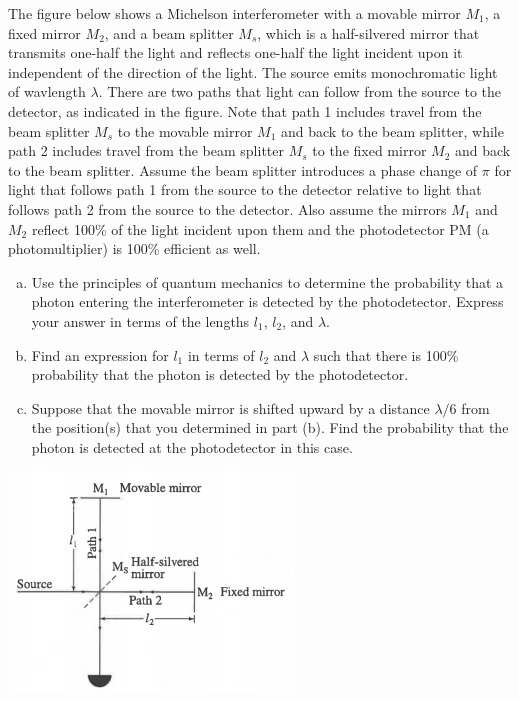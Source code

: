\documentclass[11pt]{article}
\newcommand{\be}{\begin{enumerate}[a) ]}
\newcommand{\ee}{\end{enumerate}}
\begin{document}
\begin{problem}[Townsend (P1.27)]
The figure below shows a Michelson interferometer with a movable mirror $M_1$, a fixed mirror $M_2$, and
a beam splitter $M_s$, which is a half-silvered mirror that transmits one-half the light and reflects
one-half the light incident upon it independent of the direction of the light. The source emits
monochromatic light of wavlength $\lambda$. There are two paths that light can follow from the source to
the detector, as indicated in the figure. Note that path 1 includes travel from the beam splitter
$M_s$ to the movable mirror $M_1$ and back to the beam splitter, while path 2 includes travel from the
beam splitter $M_s$ to the fixed mirror $M_2$ and back to the beam splitter. Assume the beam splitter
introduces a phase change of $\pi$ for light that follows path 1 from the source to the detector relative
to light that follows path 2 from the source to the detector. Also assume the mirrors $M_1$ and
$M_2$ reflect 100\% of the light incident upon them and the photodetector PM (a photomultiplier) is
100\% efficient as well.
\be
\item Use the principles of quantum mechanics to determine the probability that a photon entering
the interferometer is detected by the photodetector. Express your answer in terms of the
lengths $l_1$, $l_2$, and $\lambda$.
\item Find an expression for $l_1$ in terms of $l_2$ and $\lambda$ such that there is 100\% probability that the
photon is detected by the photodetector.
\item Suppose that the movable mirror is shifted upward by a distance $\lambda/6$ from the position(s)
that you determined in part (b). Find the probability that the photon is detected at the
photodetector in this case.
\ee
\begin{center}
\includegraphics[scale=0.6]{prob5.png}
\end{center}
\end{problem}
\end{document}
